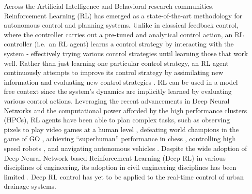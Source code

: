 Across the Artificial Intelligence and Behavioral research communities, Reinforcement Learning (RL) has emerged as a state-of-the-art methodology for autonomous control and planning systems.
Unlike in classical feedback control, where the controller carries out a pre-tuned and analytical control action, an RL controller (i.e.\ an RL agent) learns a control strategy by interacting with the system - effectively trying various control strategies until learning those that work well.
Rather than just learning one particular control strategy, an RL agent continuously attempts to improve its control strategy by assimilating new information and evaluating new control strategies \cite{Sutton98}.
RL can be used in a model free context since the system’s dynamics are implicitly learned by evaluating various control actions.
Leveraging the recent advancements in Deep Neural Networks and the computational power afforded by the high performance clusters (HPCs), RL agents have been able to plan complex tasks, such as observing pixels to play video games at a human level \cite{Mnih2015}, defeating world champions in the game of GO \cite{silver2017masteringgo}, achieving “superhuman” performance in chess \cite{Silver2017MasteringAlgorithm}, controlling high speed robots \cite{Kober2013ReinforcementSurvey}, and navigating autonomous vehicles \cite{Ng2006AutonomousLearning}.
Despite the wide adoption of Deep Neural Network based Reinforcement Learning (Deep RL) in various disciplines of engineering, its adoption in civil engineering disciplines has been limited \cite{abdulhai2003reinforcement,bhattacharya2003neural, castelletti2010tree}.
Deep RL control has yet to be applied to the real-time control of urban drainage systems.

